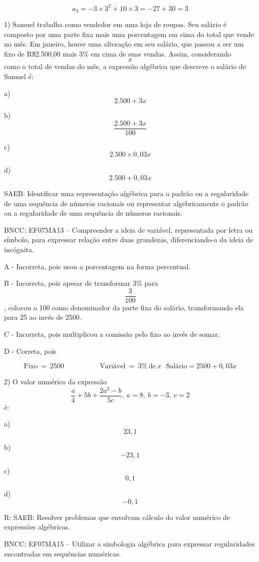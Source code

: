 \[{a}_{3} = - 3 \times 3^{2} + 10 \times 3 = - 27 + 30 = 3\]


1) Samuel trabalha como vendedor em uma loja de roupas. Seu salário é
composto por uma parte fixa mais uma porcentagem em cima do total que
vende no mês. Em janeiro, houve uma alteração em seu salário, que passou
a ser um fixo de R\$2.500,00 mais 3\% em cima de suas vendas. Assim,
considerando \[x\] como o total de vendas do mês, a expressão algébrica
que descreve o salário de Samuel é:

a) \[2.500 + 3x\]

b) \[\frac{2.500 + 3x}{100}\]

c) \[2.500 \times 0,03x\]

d) \[2.500 + 0,03x\]

SAEB: Identificar uma representação algébrica para o padrão ou a
regularidade de uma sequência de números racionais ou representar
algebricamente o padrão ou a regularidade de uma sequência de números
racionais.

BNCC: EF07MA13 -- Compreender a ideia de variável, representada por
letra ou símbolo, para expressar relação entre duas grandezas,
diferenciando-a da ideia de incógnita.

A - Incorreta, pois usou a porcentagem na forma percentual.

B - Incorreta, pois apesar de transformar 3\% para \[\frac{3}{100}\],
colocou o 100 como denominador da parte fixa do salário, transformando
ela para 25 ao invés de 2500.

C - Incorreta, pois multiplicou a comissão pelo fixo ao invés de somar.

D - Correta, pois

\[\text{Fixo}\  = \ 2500\ \ \ \ \ \ \ \ \ \ \ \ \ \ \ \ \ \ \ \ \ \ \ \text{Vari}á\text{vel}\  = \ 3\%\ \text{de}\ x\text{\ \ \ \ \ \ \ \ \ \ \ \ \ \ \ \ \ }\text{Sal}á\text{rio} = 2500 + 0,03x\]

2) O valor numérico da expressão
\[\frac{a}{4} + 5b + \frac{2a^{2} - b}{5c},\ a = 8,\ b = - 3,\ c = 2\]
é:

a) \[23,1\]

b) \[- 23,1\]

c) \[0,1\]

d) \[- 0,1\]

R: SAEB: Resolver problemas que envolvam cálculo do valor numérico de
expressões algébricas.

BNCC: EF07MA15 -- Utilizar a simbologia algébrica para expressar
regularidades encontradas em sequências numéricas.

